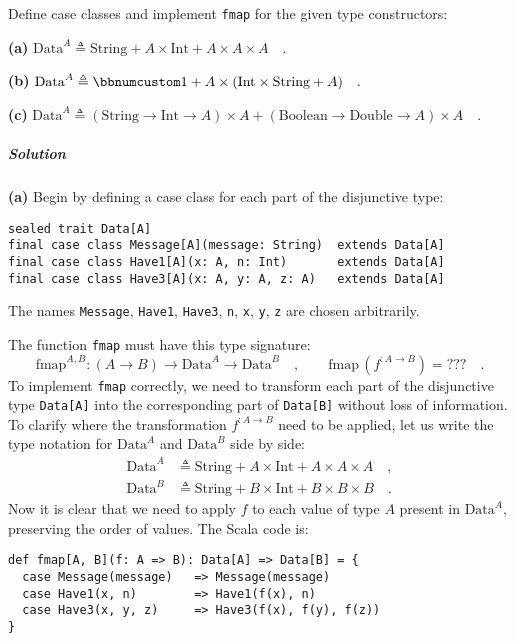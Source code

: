 Define case classes and implement \lstinline!fmap! for the given
type constructors:

\textbf{(a)} $\text{Data}^{A}\triangleq\text{String}+A\times\text{Int}+A\times A\times A\quad.$

\textbf{(b)} $\text{Data}^{A}\triangleq\bbnum 1+A\times(\text{Int}\times\text{String}+A)\quad.$

\textbf{(c)} $\text{Data}^{A}\triangleq(\text{String}\rightarrow\text{Int}\rightarrow A)\times A+(\text{Boolean}\rightarrow\text{Double}\rightarrow A)\times A\quad.$

\subparagraph{Solution}

\textbf{(a)} Begin by defining a case class for each part of the disjunctive
type:
\begin{lstlisting}
sealed trait Data[A] 
final case class Message[A](message: String)  extends Data[A]
final case class Have1[A](x: A, n: Int)       extends Data[A]  
final case class Have3[A](x: A, y: A, z: A)   extends Data[A]
\end{lstlisting}
The names \lstinline!Message!, \lstinline!Have1!, \lstinline!Have3!,
\lstinline!n!, \lstinline!x!, \lstinline!y!, \lstinline!z! are
chosen arbitrarily. 

The function \lstinline!fmap! must have this type signature:
\[
\text{fmap}^{A,B}:\left(A\rightarrow B\right)\rightarrow\text{Data}^{A}\rightarrow\text{Data}^{B}\quad,\quad\quad\text{fmap}\,(f^{:A\rightarrow B})=\text{???}\quad.
\]
To implement \lstinline!fmap! correctly, we need to transform each
part of the disjunctive type \lstinline!Data[A]! into the corresponding
part of \lstinline!Data[B]! without loss of information. To clarify
where the transformation $f^{:A\rightarrow B}$ need to be applied,
let us write the type notation for $\text{Data}^{A}$ and $\text{Data}^{B}$
side by side:
\begin{align*}
\text{Data}^{A} & \triangleq\text{String}+A\times\text{Int}+A\times A\times A\quad,\\
\text{Data}^{B} & \triangleq\text{String}+B\times\text{Int}+B\times B\times B\quad.
\end{align*}
Now it is clear that we need to apply $f$ to each value of type $A$
present in $\text{Data}^{A}$, preserving the order of values. The
Scala code is:
\begin{lstlisting}
def fmap[A, B](f: A => B): Data[A] => Data[B] = {
  case Message(message)   => Message(message)
  case Have1(x, n)        => Have1(f(x), n)
  case Have3(x, y, z)     => Have3(f(x), f(y), f(z))
}
\end{lstlisting}


